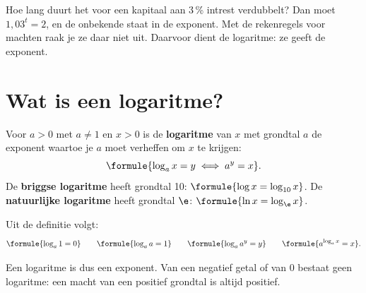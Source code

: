 %



Hoe lang duurt het voor een kapitaal aan $3$\,\% intrest verdubbelt? Dan moet $1{,}03^t = 2$, en de onbekende staat in de exponent. Met de rekenregels voor machten raak je ze daar niet uit. Daarvoor dient de logaritme: ze geeft de exponent.

\begin{oefeningen}[Start]

\end{oefeningen}

\section{Wat is een logaritme?}

\begin{theorie}
Voor $a > 0$ met $a \neq 1$ en $x > 0$ is de \textbf{\textcolor{accent}{logaritme}} van $x$ met grondtal $a$ de exponent waartoe je $a$ moet verheffen om $x$ te krijgen:
\[\formule{\log_a x = y \iff a^y = x}.\]
De \textbf{\textcolor{accent}{briggse logaritme}} heeft grondtal 10: $\formule{\log x = \log_{10} x}$. De \textbf{\textcolor{accent}{natuurlijke logaritme}} heeft grondtal $\e$: $\formule{\ln x = \log_{\e} x}$.

Uit de definitie volgt:
\[\formule{\log_a 1 = 0} \qquad \formule{\log_a a = 1} \qquad \formule{\log_a a^y = y} \qquad \formule{a^{\log_a x} = x}.\]
\end{theorie}

Een logaritme is dus een exponent. Van een negatief getal of van $0$ bestaat geen logaritme: een macht van een positief grondtal is altijd positief.

